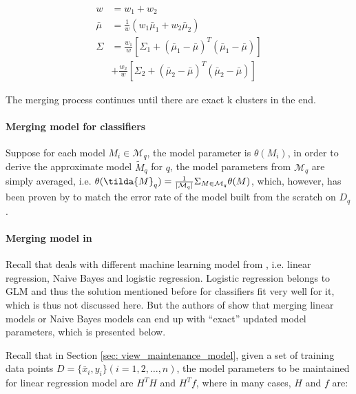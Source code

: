 \begin{equation}\label{eq: GMM_merging}
    \begin{split}
        w &= w_1 + w_2\\
        \bar{\mu} &= \frac{1}{w}(w_1\bar{\mu}_1 + w_2\bar{\mu}_2)\\
        \Sigma &= \frac{w_1}{w}[\Sigma_1 + (\bar{\mu}_1 - \bar{\mu})^T(\bar{\mu}_1 -\bar{\mu})]\\
        &+\frac{w_2}{w}[\Sigma_2 + (\bar{\mu}_2 - \bar{\mu})^T(\bar{\mu}_2 -\bar{\mu})]
    \end{split}
\end{equation}

The merging process continues until there are exact k clusters in the end.


\paragraph{Merging model for classifiers}
Suppose for each model $M_i \in \mathcal{M}_q$, the model parameter is $\theta(M_i)$, in order to derive the approximate model $\tilde{M}_q$ for $q$, the model parameters from $\mathcal{M}_q$ are simply averaged, i.e. $\theta(\tilda{M}_q) = \frac{1}{|\mathcal{M}_q|}\Sigma_{M \in \mathcal{M}_q}\theta(M)$, which, however, has been proven by \cite{zhang2012communication} to match the error rate of the model built from the scratch on $D_q$.

\paragraph{Merging model in \cite{gupta2015processing}} Recall that \cite{gupta1993maintaining} deals with different machine learning model from \cite{hasani2018efficient}, i.e. linear regression, Naive Bayes and logistic regression. Logistic regression belongs to GLM and thus the solution mentioned before for classifiers fit very well for it, which is thus not discussed here. But the authors of \cite{hasani2018efficient} show that merging linear models or Naive Bayes models can end up with ``exact'' updated model parameters, which is presented below.

Recall that in Section \ref{sec: view_maintenance_model}, given a set of training data points $D = \{\bar{x}_i, y_i\}(i=1,2,\dots,n)$, the model parameters to be maintained for linear regression model are $H^TH$ and $H^Tf$, where in many cases, $H$ and $f$ are:


